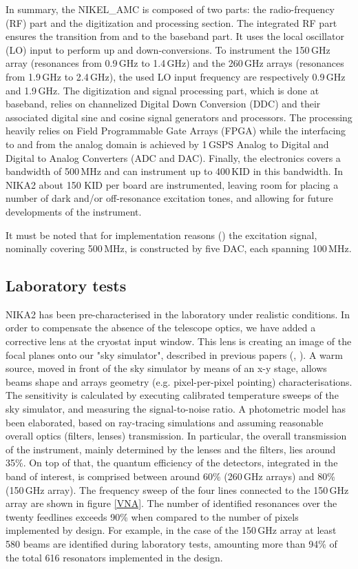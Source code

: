 \documentclass[]{aa} %
\begin{document}
In summary, the NIKEL\_AMC is composed of two parts: the radio-frequency (RF) part and the digitization and processing section.
The integrated RF part ensures the transition from and to the baseband part.
It uses the local oscillator (LO) input to perform up and down-conversions.
To instrument the 150\,GHz array (resonances from 0.9\,GHz to 1.4\,GHz) and the 260\,GHz arrays (resonances from 1.9\,GHz to 2.4\,GHz), the used LO input frequency are respectively 0.9\,GHz and 1.9\,GHz. The digitization and signal processing part, which is done at baseband, relies on channelized Digital Down Conversion (DDC) and their associated digital sine and cosine signal generators and processors.
The processing heavily relies on Field Programmable Gate Arrays (FPGA) while the interfacing to and from the analog domain is achieved by 1\,GSPS Analog to Digital and Digital to Analog Converters (ADC and DAC).
Finally, the electronics covers a bandwidth of 500\,MHz and can instrument up to 400\,KID in this bandwidth. In NIKA2 about 150 KID per board are instrumented, leaving room for placing a number of dark and/or off-resonance excitation tones, and allowing for future developments of the instrument. 

It must be noted that for implementation reasons (\cite{Bourrion2012,Bourrion2016}) the excitation signal, nominally covering 500\,MHz, is constructed by five DAC, each spanning 100\,MHz.



\subsection{Laboratory tests}
\label{Laboratory tests}

NIKA2 has been pre-characterised in the laboratory under realistic conditions. In order to compensate the absence of the telescope optics, we have added a corrective lens at the cryostat input window. This lens is creating an image of the focal planes onto our "sky simulator", described in previous papers (\cite{Catalano2014}, \cite{Monfardini2011}). A warm source, moved in front of the sky simulator by means of an x-y stage, allows beams shape and arrays geometry (e.g. pixel-per-pixel pointing) characterisations. The sensitivity is calculated by executing calibrated temperature sweeps of the sky simulator, and measuring the signal-to-noise ratio. A photometric model has been elaborated, based on ray-tracing simulations and assuming reasonable overall optics (filters, lenses) transmission. In particular, the overall transmission of the instrument, mainly determined by the lenses and the filters, lies around 35\%. On top of that, the quantum efficiency of the detectors, integrated in the band of interest, is comprised between around 60\% (260\,GHz arrays) and 80\% (150\,GHz array). The frequency sweep of the four lines connected to the 150\,GHz array are shown in figure \ref{VNA}. The number of identified resonances over the twenty feedlines exceeds 90\% when compared to the number of pixels implemented by design. For example, in the case of the 150\,GHz array at least 580 beams are identified during laboratory tests, amounting more than 94\% of the total 616 resonators implemented in the design. 
\end{document}
